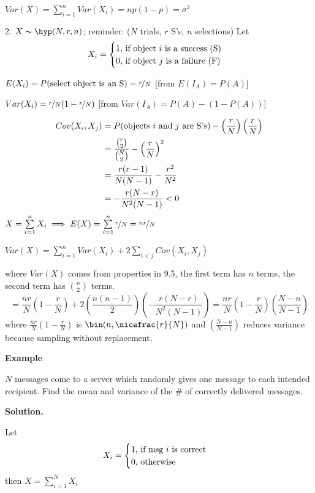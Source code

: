 $ Var(X)=\sum\limits_{i=1}^{n} Var(X_i)=np(1-p)=\sigma^2 $

2. $ X \thicksim \hyp(N,r,n) $; reminder: 
($ N $ trials, $ r $ S's, $ n $ selections)
Let
\[X_i=\begin{cases}
    1,\,\text{if object $ i $ is a success (S)}\\
    0,\,\text{if object $ j $ is a failure (F)}
\end{cases} \]

$ E(X_i)=P(\text{select object is an S})=\nicefrac{r}{N} $
[from $E(I_A)=P(A)$]

$ Var(X_i)=\nicefrac{r}{N} (1-\nicefrac{r}{N} ) $
[from $ Var(I_A)=P(A)-(1-P(A)) $]

\begin{align*}
    Cov(X_i,X_j)
    &=P(\text{objects $ i $ and $ j $ are S's})-
    \left(\frac{r}{N}\right)\left(\frac{r}{N}\right)\\
    &=\frac{\binom{r}{2}}{\binom{N}{2}}-\left(\frac{r}{N}\right)^2\\
    &=\frac{r(r-1)}{N(N-1)} -\frac{r^2}{N^2}\\
    &=-\frac{r(N-r)}{N^2(N-1)}<0  
\end{align*}
$ X=\sum\limits_{i=1}^{n} X_i\implies E(X)=\sum\limits_{i=1}^{n} \nicefrac{r}{N} =
\nicefrac{nr}{N} $

$ Var(X)=\sum\limits_{i=1}^{n} Var(X_i)+2 \sum\limits_{i<j} Cov(X_i,X_j)  $

where $ Var(X) $ comes from properties in 9.5, the first term has $ n $ terms,
the second term has $ \binom{n}{2} $ terms.
\[=\frac{nr}{N} \left(1-\frac{r}{N}\right)+2\left(\frac{n(n-1)}{2}\right)
\left(-\frac{r(N-r)}{N^2(N-1)}\right)=\frac{nr}{N} \left(1-\frac{r}{N}\right)
\left(\frac{N-n}{N-1}\right) \]
where $ \frac{nr}{N} \left(1-\frac{r}{N}\right)$ is $\bin(n,\nicefrac{r}{N}) $
and $ \left(\frac{N-n}{N-1}\right) $ reduces variance because sampling without replacement.

\textbf{Example}

$ N $ messages come to a server which randomly gives one message to each
intended recipient. Find the mean and variance of the \# of correctly delivered
messages.

\textbf{Solution.}

Let
\[ X_i=
\begin{cases}
    1,\,\text{if msg $ i $ is correct}\\
    0,\,\text{otherwise}
\end{cases} \]
then $ X=\sum\limits_{i=1}^{N}X_i $

